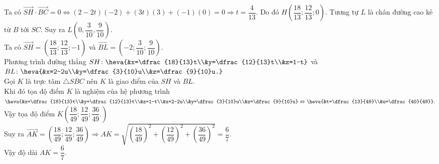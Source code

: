 \begin{bt}
{		Ta có 
		$\overrightarrow{SH} \cdot \overrightarrow{BC} = 0\Leftrightarrow
		(2 - 2t)(-2) + (3t)(3) + (-1)(0) = 0 \Rightarrow t = \dfrac{4}{13}$.
		Do đó $H\left(\dfrac{18}{13}; \dfrac{12}{13}; 0\right)$.
		Tương tự $L$ là chân đường cao kẻ từ $B$ tới $SC$. Suy ra $L\left(0, \dfrac{3}{10}, \dfrac{9}{10}\right)$.\\
		Ta có $\overrightarrow{SH}=\left(\dfrac{18}{13};\dfrac{12}{13}; -1\right)$ và $\overrightarrow{BL}=\left(-2;\dfrac{3}{10};\dfrac{9}{10}\right) $.\\
		Phương trình đường thẳng $SH\colon\heva{&x=\dfrac{18}{13}t\\&y=\dfrac{12}{13}t\\&z=1-t}$ và $BL\colon \heva{&x=2-2u\\&y=\dfrac{3}{10}u\\&z=\dfrac{9}{10}u.}$\\
		Gọi $K$ là trực tâm $\triangle SBC$ nên $K$ là giao điểm của $SH$ và $BL$.\\
		Khi đó tọa độ điểm $K$ là nghiệm của hệ phương trình $\heva{&x=\dfrac{18}{13}t\\&y=\dfrac{12}{13}t\\&z=1-t\\&x=2-2u\\&y=\dfrac{3}{10}u\\&z=\dfrac{9}{10}u}\Leftrightarrow \heva{&t=\dfrac{13}{49}\\&u=\dfrac{40}{49}}.$\\
		Vậy tọa độ điểm $K\left(\dfrac{18}{49};\dfrac{12}{49};\dfrac{36}{49}.\right)$\\
		Suy ra $\overrightarrow{AK}=\left(\dfrac{18}{49};\dfrac{12}{49};\dfrac{36}{49}\right)\Rightarrow AK=\sqrt{\left(\dfrac{18}{49}\right)^2 + \left(\dfrac{12}{49}\right)^2 + \left(\dfrac{36}{49}\right)^2}=\dfrac{6}{7}$.\\
		Vậy độ dài $AK = \dfrac{6}{7}$.
	}
	
\end{bt}

